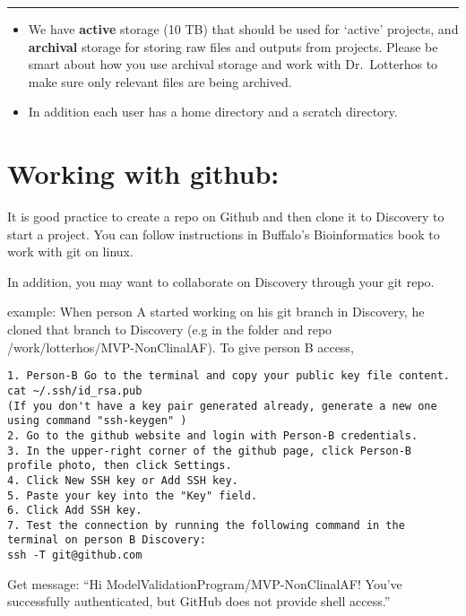 \documentclass[
  letterpaper,
  DIV=11,
  numbers=noendperiod]{scrreprt}
\begin{document}
\begin{center}\rule{0.5\linewidth}{0.5pt}\end{center}

\begin{itemize}
\item
  We have \textbf{active} storage (10 TB) that should be used for
  `active' projects, and \textbf{archival} storage for storing raw files
  and outputs from projects. Please be smart about how you use archival
  storage and work with Dr.~Lotterhos to make sure only relevant files
  are being archived.
\item
  In addition each user has a home directory and a scratch directory.
\end{itemize}

\hypertarget{working-with-github}{%
\section*{\texorpdfstring{\textbf{Working with
github:}}{Working with github:}}\label{working-with-github}}

It is good practice to create a repo on Github and then clone it to
Discovery to start a project. You can follow instructions in Buffalo's
Bioinformatics book to work with git on linux.

In addition, you may want to collaborate on Discovery through your git
repo.

example: When person A started working on his git branch in Discovery,
he cloned that branch to Discovery (e.g in the folder and repo
/work/lotterhos/MVP-NonClinalAF). To give person B access,

\begin{verbatim}
1. Person-B Go to the terminal and copy your public key file content.
cat ~/.ssh/id_rsa.pub
(If you don't have a key pair generated already, generate a new one using command "ssh-keygen" )
2. Go to the github website and login with Person-B credentials.
3. In the upper-right corner of the github page, click Person-B profile photo, then click Settings.
4. Click New SSH key or Add SSH key.
5. Paste your key into the "Key" field.
6. Click Add SSH key.
7. Test the connection by running the following command in the terminal on person B Discovery:
ssh -T git@github.com 
\end{verbatim}

Get message: ``Hi ModelValidationProgram/MVP-NonClinalAF! You've
successfully authenticated, but GitHub does not provide shell access.''
\end{document}
